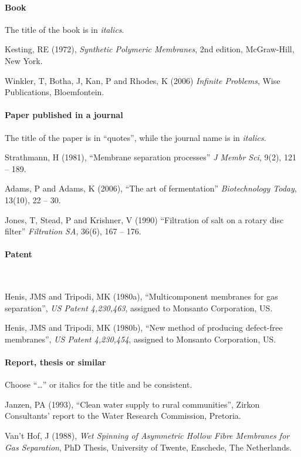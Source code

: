 \documentclass[a5paper, 10pt]{article}
\begin{document}
\paragraph{Book}
The title of the book is in \emph{italics}.

Kesting, RE (1972), \textit{Synthetic Polymeric Membranes}, 2nd edition,
  McGraw-Hill, New York.

Winkler, T, Botha, J, Kan, P and Rhodes, K (2006)
  \textit{Infinite Problems}, Wise Publications, Bloemfontein.

\paragraph{Paper published in a journal}
The title of the paper is in ``quotes'', while the journal name is in \emph{italics}.

Strathmann, H (1981), ``Membrane separation processes''
  \textit{J  Membr  Sci}, 9(2), 121 -- 189.

Adams, P and Adams, K (2006), ``The art of fermentation''
  \textit{Biotechnology Today}, 13(10), 22 -- 30.

Jones, T, Stead, P and Krishner, V (1990) ``Filtration of salt
  on a rotary disc filter'' \textit{Filtration SA}, 36(6), 167 -- 176.

\paragraph{Patent}
~

Henis, JMS and Tripodi, MK  (1980a), ``Multicomponent membranes
for gas separation'', \textit{US Patent 4,230,463}, assigned to Monsanto
Corporation, US.

Henis, JMS and Tripodi, MK (1980b), ``New method of producing
  defect-free membranes'', \textit{US Patent 4,230,454}, assigned to
  Monsanto Corporation, US.

\paragraph{Report, thesis or similar}
Choose ``\dots'' or italics for the title and be consistent.

Janzen, PA (1993), ``Clean water supply to rural communities'',
  Zirkon Consultants' report to the Water Research Commission,
  Pretoria.
  
Van't Hof, J (1988), \textit{Wet Spinning of Asymmetric Hollow
    Fibre Membranes for Gas Separation}, PhD Thesis, University of
  Twente, Enschede, The Netherlands.
  
\end{document}
